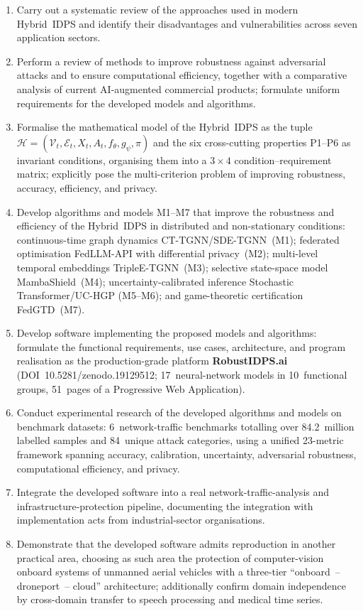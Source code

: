 \documentclass[12pt,a5paper]{article}
\begin{document}
\begin{enumerate}
\item Carry out a systematic review of the approaches used in
modern Hybrid~IDPS and identify their disadvantages and
vulnerabilities across seven application sectors.

\item Perform a review of methods to improve robustness against
adversarial attacks and to ensure computational efficiency,
together with a comparative analysis of current AI-augmented
commercial products; formulate uniform requirements for the
developed models and algorithms.

\item Formalise the mathematical model of the Hybrid~IDPS as the
tuple $\mathcal{H} = (\mathcal{V}_t, \mathcal{E}_t, X_t, A_t,
f_\theta, g_\psi, \pi)$ and the six cross-cutting properties
P1--P6 as invariant conditions, organising them into a
$3\times4$ condition--requirement matrix; explicitly pose the
multi-criterion problem of improving robustness, accuracy,
efficiency, and privacy.

\item Develop algorithms and models M1--M7 that improve the
robustness and efficiency of the Hybrid~IDPS in distributed and
non-stationary conditions: continuous-time graph dynamics
CT-TGNN/SDE-TGNN~(M1); federated optimisation FedLLM-API with
differential privacy~(M2); multi-level temporal embeddings
TripleE-TGNN~(M3); selective state-space model MambaShield~(M4);
uncertainty-calibrated inference Stochastic Transformer/UC-HGP
(M5--M6); and game-theoretic certification FedGTD~(M7).

\item Develop software implementing the proposed models and
algorithms: formulate the functional requirements, use cases,
architecture, and program realisation as the production-grade
platform \textbf{RobustIDPS.ai} (DOI~10.5281/zenodo.19129512;
17~neural-network models in 10~functional groups, 51~pages of a
Progressive Web Application).

\item Conduct experimental research of the developed algorithms
and models on benchmark datasets: 6~network-traffic benchmarks
totalling over 84.2~million labelled samples and 84~unique
attack categories, using a unified 23-metric framework spanning
accuracy, calibration, uncertainty, adversarial robustness,
computational efficiency, and privacy.

\item Integrate the developed software into a real
network-traffic-analysis and infrastructure-protection pipeline,
documenting the integration with implementation acts from
industrial-sector organisations.

\item Demonstrate that the developed software admits reproduction
in another practical area, choosing as such area the protection
of computer-vision onboard systems of unmanned aerial vehicles
with a three-tier ``onboard~-- droneport~-- cloud'' architecture;
additionally confirm domain independence by cross-domain
transfer to speech processing and medical time series.
\end{enumerate}
\end{document}
